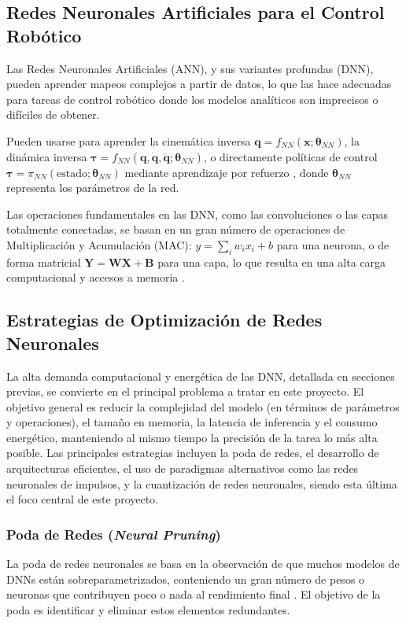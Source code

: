 \documentclass[12pt]{article}
\begin{document}
\subsection{Redes Neuronales Artificiales para el Control Robótico}
\label{ssec:ann_control_robotico}
Las Redes Neuronales Artificiales (ANN), y sus variantes profundas (DNN), pueden aprender mapeos complejos a partir de datos, lo que las hace adecuadas para tareas de control robótico donde los modelos analíticos son imprecisos o difíciles de obtener.

Pueden usarse para aprender la cinemática inversa $\bm{q} = f_{NN}(\bm{x}; \bm{\theta}_{NN})$, la dinámica inversa $\bm{\tau} = f_{NN}(\bm{q}, \dot{\bm{q}}, \ddot{\bm{q}}; \bm{\theta}_{NN})$, o directamente políticas de control $\bm{\tau} = \pi_{NN}(\text{estado}; \bm{\theta}_{NN})$ mediante aprendizaje por refuerzo \cite{Park2025electronics, Zanatta2024exploring}, donde $\bm{\theta}_{NN}$ representa los parámetros de la red.

Las operaciones fundamentales en las DNN, como las convoluciones o las capas totalmente conectadas, se basan en un gran número de operaciones de Multiplicación y Acumulación (MAC): $y = \sum_i w_i x_i + b$ para una neurona, o de forma matricial $\bm{Y} = \bm{W}\bm{X} + \bm{B}$ para una capa, lo que resulta en una alta carga computacional y accesos a memoria \cite{Chen2021memristor}.

\subsection{Estrategias de Optimización de Redes Neuronales}
\label{ssec:optimizacion_nn_exp}
La alta demanda computacional y energética de las DNN, detallada en secciones previas, se convierte en el principal problema a tratar en este proyecto. El objetivo general es reducir la complejidad del modelo (en términos de parámetros y operaciones), el tamaño en memoria, la latencia de inferencia y el consumo energético, manteniendo al mismo tiempo la precisión de la tarea lo más alta posible. Las principales estrategias incluyen la poda de redes, el desarrollo de arquitecturas eficientes, el uso de paradigmas alternativos como las redes neuronales de impulsos, y la cuantización de redes neuronales, siendo esta última el foco central de este proyecto.

\subsubsection{Poda de Redes (\textit{Neural Pruning})}
\label{sssec:pruning_exp}
La poda de redes neuronales se basa en la observación de que muchos modelos de DNNs están sobreparametrizados, conteniendo un gran número de pesos o neuronas que contribuyen poco o nada al rendimiento final \cite{Liang2021PruningSurvey}. El objetivo de la poda es identificar y eliminar estos elementos redundantes.
\end{document}
